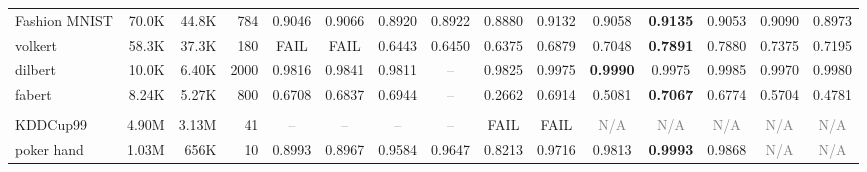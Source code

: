\begin{table}[t]
{\begin{tabular}{lrrrccccccccccc}
Fashion MNIST & 70.0K & 44.8K & 784 & \cellcolor[HTML]{F4F0CE}0.9046 & \cellcolor[HTML]{EEEECF}0.9066 & \cellcolor[HTML]{F7D8CC}0.8920 & \cellcolor[HTML]{F8D9CC}0.8922 & \cellcolor[HTML]{F4CCCC}0.8880 & \cellcolor[HTML]{DAEAD3}0.9132 & \cellcolor[HTML]{F0EFCF}0.9058 & \cellcolor[HTML]{D9EAD3}\textbf{0.9135} & \cellcolor[HTML]{F1EFCE}0.9053 & \cellcolor[HTML]{E6EDD1}0.9090 & \cellcolor[HTML]{FCE8CC}0.8973 \\
volkert & 58.3K & 37.3K & 180 & \textcolor{red!70!black}{FAIL} & \textcolor{red!70!black}{FAIL} & \cellcolor[HTML]{F5CFCC}0.6443 & \cellcolor[HTML]{F5D0CC}0.6450 & \cellcolor[HTML]{F4CCCC}0.6375 & \cellcolor[HTML]{FBE5CC}0.6879 & \cellcolor[HTML]{FEEECC}0.7048 & \cellcolor[HTML]{D9EAD3}\textbf{0.7891} & \cellcolor[HTML]{DAEAD3}0.7880 & \cellcolor[HTML]{F3EFCE}0.7375 & \cellcolor[HTML]{FCF1CD}0.7195 \\
dilbert & 10.0K & 6.40K & 2000 & \cellcolor[HTML]{F5CECC}0.9816 & \cellcolor[HTML]{F8D9CC}0.9841 & \cellcolor[HTML]{F4CCCC}0.9811 & \textcolor{gray}{--} & \cellcolor[HTML]{F6D2CC}0.9825 & \cellcolor[HTML]{DFEBD2}0.9975 & \cellcolor[HTML]{D9EAD3}\textbf{0.9990} & \cellcolor[HTML]{DFEBD2}0.9975 & \cellcolor[HTML]{DBEAD3}0.9985 & \cellcolor[HTML]{E1ECD1}0.9970 & \cellcolor[HTML]{DDEBD2}0.9980 \\
fabert & 8.24K & 5.27K & 800 & \cellcolor[HTML]{DFEBD2}0.6708 & \cellcolor[HTML]{DDEBD2}0.6837 & \cellcolor[HTML]{DBEAD3}0.6944 & \textcolor{gray}{--} & \cellcolor[HTML]{F4CCCC}0.2662 & \cellcolor[HTML]{DCEBD3}0.6914 & \cellcolor[HTML]{FBF1CD}0.5081 & \cellcolor[HTML]{D9EAD3}\textbf{0.7067} & \cellcolor[HTML]{DEEBD2}0.6774 & \cellcolor[HTML]{F1EFCF}0.5704 & \cellcolor[HTML]{FFF1CC}0.4781 \\
\addlinespace[2pt]
\rowcolor{gray!15}
\multicolumn{15}{l}{\textbf{ROC--AUC}} \\
KDDCup99 & 4.90M & 3.13M & 41 & \textcolor{gray}{--} & \textcolor{gray}{--} & \textcolor{gray}{--} & \textcolor{gray}{--} & \textcolor{red!70!black}{FAIL} & \textcolor{red!70!black}{FAIL} & \textcolor{gray}{N/A} & \textcolor{gray}{N/A} & \textcolor{gray}{N/A} & \textcolor{gray}{N/A} & \textcolor{gray}{N/A} \\
poker hand & 1.03M & 656K & 10 & \cellcolor[HTML]{FEEDCC}0.8993 & \cellcolor[HTML]{FDECCC}0.8967 & \cellcolor[HTML]{EAEED0}0.9584 & \cellcolor[HTML]{E8EDD0}0.9647 & \cellcolor[HTML]{F4CCCC}0.8213 & \cellcolor[HTML]{E5ECD1}0.9716 & \cellcolor[HTML]{E1ECD2}0.9813 & \cellcolor[HTML]{D9EAD3}\textbf{0.9993} & \cellcolor[HTML]{DEEBD2}0.9868 & \textcolor{gray}{N/A} & \textcolor{gray}{N/A} \\

\end{tabular}}
\end{table}
